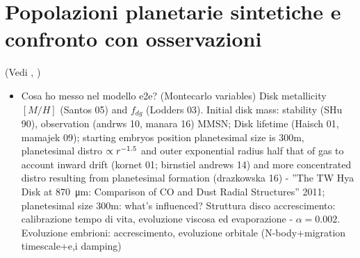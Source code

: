 {\let\clearpage\relax\let\cleardoublepage\relax
\chapter{Popolazioni planetarie sintetiche e confronto con osservazioni}
}
(Vedi \cite{mordasini2009extrasolar}, \cite{mordasini2018planetary})

\begin{workout}
	\begin{itemize}
		\item Cosa ho messo nel modello e2e? (Montecarlo variables) Disk metallicity $[M/H]$ (Santos 05) and $f_{dg}$ (Lodders 03). Initial disk mass: stability (SHu 90), observation (andrws 10, manara 16) MMSN; Disk lifetime (Haisch 01, mamajek 09); starting embryos position
		planetesimal size is 300m, planetesimal distro $\propto r^{-1.5}$ and outer exponential radius half that of gas to account inward drift (kornet 01; birnstiel andrews 14) and more concentrated distro resulting from planetesimal formation (drazkowska 16) - ''The TW Hya Disk at \SI{870}{\micro\meter}:  Comparison of CO and Dust Radial Structures'' 2011; planetesimal size 300m: what's influenced?
		Struttura disco accrescimento: calibrazione tempo di vita, evoluzione viscosa ed evaporazione - $\alpha=0.002$.
		Evoluzione embrioni: accrescimento, evoluzione orbitale (N-body+migration timescale+e,i damping)
		

\end{itemize}
\end{workout}
